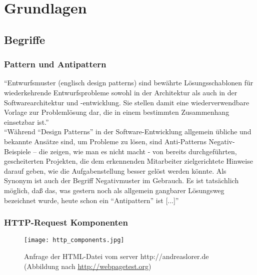 

\section{Grundlagen} %
\label{sec:grundlagen}

	\subsection{Begriffe}
	\label{sub:begriffe}
		\subsubsection{Pattern und Antipattern} %
		\label{ssub:pattern_und_anti_pattern}
			"`Entwurfsmuster (englisch design patterns) sind bewährte Lösungsschablonen für wiederkehrende Entwurfsprobleme sowohl in der Architektur als auch in der Softwarearchitektur und -entwicklung. Sie stellen damit eine wiederverwendbare Vorlage zur Problemlösung dar, die in einem bestimmten Zusammenhang einsetzbar ist."'\autocite{pattern15}
			\\

			"`Während "`Design Patterns"' in der Software-Entwicklung allgemein übliche und bekannte Ansätze sind, um Probleme zu lösen, sind Anti-Patterns Negativ-Beispiele – die zeigen, wie man es nicht macht - von bereits durchgeführten, gescheiterten Projekten, die dem erkennenden Mitarbeiter zielgerichtete Hinweise darauf geben, wie die Aufgabenstellung besser gelöst werden könnte. Als Synonym ist auch der Begriff Negativmuster im Gebrauch. Es ist tatsächlich möglich, daß das, was gestern noch als allgemein gangbarer Lösungsweg bezeichnet wurde, heute schon ein "`Antipattern"' ist [...]"' \autocite{Stepken06}


		\subsubsection{HTTP-Request Komponenten} %
		\label{ssub:http_request_komponente}
			\begin{figure}[htbp]
				\begin{center}
					\texttt{[image: http\_components.jpg]}
					\caption{Anfrage der HTML-Datei vom server http://andreaslorer.de (Abbildung nach \url{http://webpagetest.org})}
					\label{fig:http_components}
				\end{center}
			\end{figure}

